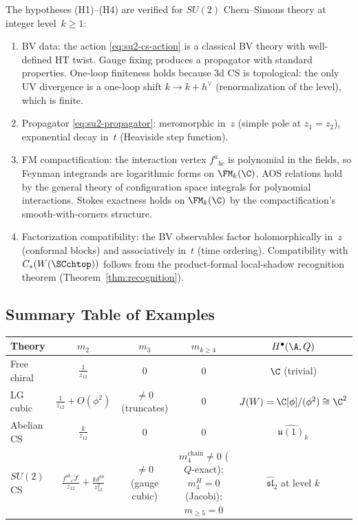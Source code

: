 \begin{proposition}
The hypotheses \textrm{(H1)--(H4)} are verified for $SU(2)$
Chern--Simons theory at integer level~$k \geq 1$:
\begin{enumerate}[label=\textup{(H\arabic*)}]
\item BV data: the action \eqref{eq:su2-cs-action} is a
 classical BV theory with well-defined HT twist. Gauge fixing
 produces a propagator with standard properties. One-loop
 finiteness holds because 3d CS is topological: the only
 UV divergence is a one-loop shift $k \to k + h^\vee$
 (renormalization of the level), which is finite.
\item Propagator \eqref{eq:su2-propagator}: meromorphic in~$z$
 (simple pole at $z_1 = z_2$), exponential decay in~$t$
 (Heaviside step function).
\item FM compactification: the interaction vertex $f^a{}_{bc}$
 is polynomial in the fields, so Feynman integrands are
 logarithmic forms on $\FM_k(\C)$. AOS relations hold by the
 general theory of configuration space integrals for
 polynomial interactions. Stokes exactness holds on
 $\FM_k(\C)$ by the compactification's smooth-with-corners
 structure.
\item Factorization compatibility: the BV observables factor
 holomorphically in~$z$ (conformal blocks) and associatively
 in~$t$ (time ordering). Compatibility with
 $C_\ast(W(\SCchtop))$ follows from the product-formal local-shadow
 recognition theorem (Theorem~\ref{thm:recognition}).
\end{enumerate}
\end{proposition}

\subsection{Summary Table of Examples}

\begin{center}
\begin{tabular}{|l|c|c|c|c|}
\hline
\textbf{Theory} & $m_2$ & $m_3$ & $m_{k \geq 4}$ & $H^\bullet(\A, Q)$ \\
\hline
Free chiral & $\frac{1}{z_{12}}$ & $0$ & $0$ & $\C$ (trivial) \\
\hline
LG cubic & $\frac{1}{z_{12}} + O(\phi^2)$ & $\neq 0$ (truncates) & $0$ & $J(W) = \C[\phi]/(\phi^2) \cong \C^2$ \\
\hline
Abelian CS & $\frac{k}{z_{12}}$ & $0$ & $0$ & $\widehat{\mathfrak{u}(1)}_k$ \\
\hline
$SU(2)$ CS & $\frac{f^{ab}{}_c J^c}{z_{12}} + \frac{k\delta^{ab}}{z_{12}^2}$ & $\neq 0$ (gauge cubic) & $m_4^{\mathrm{chain}} \neq 0$ ($Q$-exact); $m_4^H = 0$ (Jacobi); $m_{\geq 5} = 0$ & $\widehat{\mathfrak{sl}}_2$ at level $k$ \\
\hline
\end{tabular}
\end{center}

